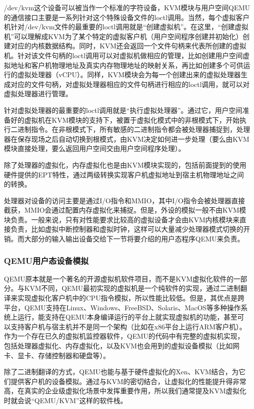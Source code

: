 /dev/kvm这个设备可以被当作一个标准的字符设备，KVM模块与用户空间QEMU的通信接口主要是一系列针对这个特殊设备文件的loctl调用。当然，每个虚拟客户机针对/dev/kvm文件的最重要的loctl调用就是“创建虚拟机”。在这里，“创建虚拟机”可以理解成KVM为了某个特定的虚拟客户机（用户空间程序创建并初始化）创建对应的内核数据结构。同时，KVM还会返回一个文件句柄来代表所创建的虚拟机。针对该文件句柄的loctl调用可以对虚拟机做相应的管理，比如创建用户空间虚拟地址和客户机物理地址及真实内存物理地址的映射关系，再比如创建多个可供运行的虚拟处理器（vCPU）。同样，KVM模块会为每一个创建出来的虚拟处理器生成对应的文件句柄，对虚拟处理器相应的文件句柄进行相应的loctl调用，就可以对虚拟处理器进行管理。

针对虚拟处理器的最重要的loctl调用就是“执行虚拟处理器”。通过它，用户空间准备好的虚拟机在KVM模块的支持下，被置于虚拟化模式中的非根模式下，开始执行二进制指令。在非根模式下，所有敏感的二进制指令都会被处理器捕捉到，处理器在保存现场之后自动切换到根模式，由KVM决定如何进一步处理（要么由KVM模块直接处理，要么返回用户空间交由用户空间程序处理）。

除了处理器的虚拟化，内存虚拟化也是由KVM模块实现的，包括前面提到的使用硬件提供的EPT特性，通过两级转换实现客户机虚拟地址到宿主机物理地址之间的转换。

处理器对设备的访问主要是通过I/O指令和MMIO，其中I/O指令会被处理器直接截获，MMIO会通过配置内存虚拟化来捕捉。但是，外设的模拟一般不由KVM模块负责。一般来说，只有对性能要求比较高的虚拟设备才会由KVM内核模块来直接负责，比如虚拟中断控制器和虚拟时钟，这样可以大量减少处理器模式切换的开销。而大部分的输入输出设备交给下一节将要介绍的用户态程序QEMU来负责。

\subsubsection{QEMU用户态设备模拟}
QEMU原本就是一个著名的开源虚拟机软件项目，而不是KVM虚拟化软件的一部分。与KVM不同，QEMU最初实现的虚拟机是一个纯软件的实现，通过二进制翻译来实现虚拟化客户机中的CPU指令模拟，所以性能比较低。但是，其优点是跨平台，QEMU支持在Linux、Windows、FreeBSD、Solaris、MacOS等多种操作系统上运行，能支持在QEMU本身编译运行的平台上就实现虚拟机的功能，甚至可以支持客户机与宿主机并不是同一个架构（比如在x86平台上运行ARM客户机）。作为一个存在已久的虚拟机监控器软件，QEMU的代码中有完整的虚拟机实现，包括处理器虚拟化、内存虚拟化，以及KVM也会用到的虚拟设备模拟（比如网卡、显卡、存储控制器和硬盘等）。

除了二进制翻译的方式，QEMU也能与基于硬件虚拟化的Xen、KVM结合，为它们提供客户机的设备模拟。通过与KVM的密切结合，让虚拟化的性能提升得非常高，在真实的企业级虚拟化场景中发挥重要作用，所以我们通常提及KVM虚拟化时就会说“QEMU/KVM”这样的软件栈。


